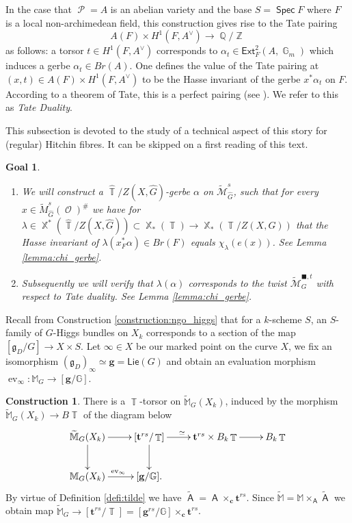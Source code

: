 \documentclass{article}
\DeclareMathOperator{\ev}{ev}
\DeclareMathOperator{\A}{\mathsf{A}}
\newcommand{\Gb}{\mathbb{G}}
\DeclareMathOperator{\Zb}{\mathbb{Z}}
\DeclareMathOperator{\Xb}{\mathbb{X}}
\DeclareMathOperator{\G}{\mathbb{G}}
\DeclareMathOperator{\Tb}{\mathbb{T}}
\newcommand{\Mc}{\mathcal{M}}
\DeclareMathOperator{\Pc}{\mathcal{P}}
\DeclareMathOperator{\Spec}{\mathsf{Spec}}
\DeclareMathOperator{\Oo}{\mathcal{O}}
\DeclareMathOperator{\Qb}{\mathbb{Q}}
\theoremstyle{definition}
\newtheorem{construction}[definition]{Construction}
\theoremstyle{plain}
\newtheorem{goal}[definition]{Goal}
\begin{document}
In the case that $\Pc = A$ is an abelian variety and the base $S = \Spec F$ where $F$ is a local non-archimedean field, this construction gives rise to the Tate pairing
$$A(F) \times H^1(F,A^{\vee}) \to \Qb/\Zb$$
as follows: a torsor $t \in H^1(F,A^{\vee})$ corresponds to $\alpha_t \in \mathsf{Ext}^2_F(A,\G_m)$ which induces a gerbe $\alpha_t \in Br(A)$. One defines the value of the Tate pairing at $(x,t) \in A(F) \times H^1(F,A^{\vee})$ to be the Hasse invariant of the gerbe $x^*\alpha_t$ on $F$. According to a theorem of Tate, this is a perfect pairing (see \cite[I.3.4]{MilneADT}). We refer to this as \emph{Tate Duality}.

This subsection is devoted to the study of a technical aspect of this story for (regular) Hitchin fibres. It can be skipped on a first reading of this text.

\begin{goal}\begin{enumerate}[(1)]
\item We will construct a $\widehat{\Tb}/Z(X,\widehat{G})$-gerbe $\alpha$ on $\widetilde{\Mc}_{\widehat{G}}^{s}$, such that for every $x \in \widetilde{M}_{\widehat{G}}^{s}(\Oo)^{\#}$ we have for $\lambda \in \Xb^*(\widehat{\Tb}/Z(X,\widehat{G})) \subset \Xb_*(\Tb) \to \Xb_*(\Tb/Z(X,G))$ that the Hasse invariant of $\lambda(x_F^*\alpha) \in Br(F)$ equals $\chi_{\lambda}(e(x))$. See Lemma \ref{lemma:chi_gerbe}.
\item Subsequently we will verify that $\lambda(\alpha)$ corresponds to the twist $\widetilde{\Mc}_G^{\blacksquare,t}$ with respect to Tate duality. See Lemma \ref{lemma:chi_gerbe}.
\end{enumerate}
\end{goal}

Recall from Construction \ref{construction:ngo_higgs} that for a $k$-scheme $S$, an $S$-family of $G$-Higgs bundles on $X_k$ corresponds to a section of the map $[\mathfrak{g}_D/G] \to X \times S$. Let $\infty \in X$ be our marked point on the curve $X$, we fix an isomorphism $(\mathfrak{g}_D)_{\infty} \simeq \mathbf{g} = \mathsf{Lie}(G)$ and obtain an evaluation morphism $\ev_{\infty}\colon \mathbb{M}_G \to [\mathbf{g}/\Gb]$.

\begin{construction}\label{const:T-torsor}
There is a $\Tb$-torsor on $\widetilde{\mathbb{M}}_G(X_k)$, induced by the morphism $\widetilde{\mathbb{M}}_G(X_k) \to B\Tb$ of the diagram below
\[
\xymatrix{
\widetilde{\mathbb{M}}_G(X_k) \ar[r] \ar[d] & [\mathbf{t}^{rs}/\Tb] \ar[d] \ar[r]^{\simeq} & \mathbf{t}^{rs} \times B_k\Tb \ar[r] & B_k\Tb \\
\mathbb{M}_G(X_k) \ar[r]^{\ev_{\infty}} & [\mathbf{g}/\Gb]. & &
}
\] 
By virtue of Definition \ref{defi:tilde} we have $\widetilde{\A} = \A \times_{\mathbf{c}} \mathbf{t}^{rs}$. Since $\widetilde{\mathbb{M}} = \mathbb{M} \times_{\A} \widetilde{\A}$ we obtain map $\widetilde{\mathbb{M}}_G \to [\mathbf{t}^{rs}/\Tb] = [\mathbf{g}^{rs}/\Gb] \times_{\mathbf{c}} \mathbf{t}^{rs}$.
\end{construction}
\end{document}
